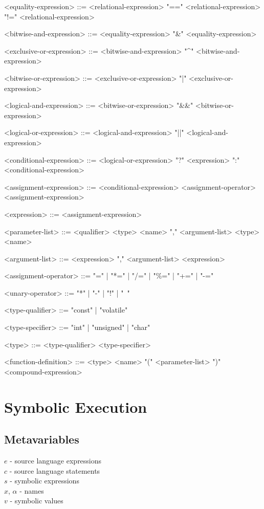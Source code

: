 \documentclass{article}
\begin{document}
\begin{grammar}
<equality-expression> ::= <relational-expression>
   "==" <relational-expression>
   "!=" <relational-expression>

<bitwise-and-expression> ::= <equality-expression>
   "&" <equality-expression>

<exclusive-or-expression> ::= <bitwise-and-expression>
   "^" <bitwise-and-expression>

<bitwise-or-expression> ::= <exclusive-or-expression>
   "|" <exclusive-or-expression>

<logical-and-expression> ::= <bitwise-or-expression>
   "&&" <bitwise-or-expression>

<logical-or-expression> ::= <logical-and-expression>
   "||" <logical-and-expression>

<conditional-expression> ::= <logical-or-expression>
   "?" <expression> ":" <conditional-expression>

<assignment-expression> ::= <conditional-expression>
   <assignment-operator> <assignment-expression>

<expression> ::= <assignment-expression>

<parameter-list> ::= <qualifier> <type> <name> "," <argument-list>
   <type> <name>

<argument-list> ::= <expression> "," <argument-list>
  \alt <expression>

<assignment-operator> ::= "=" | "*=" | "/=" | "\%=" | "+=" | "-="

<unary-operator> ::= "*" | "-" | "!" | "~"

<type-qualifier> ::= "const" | "volatile"

<type-specifier> ::= "int" | "unsigned" | "char" %

<type> ::= <type-qualifier> <type-specifier>

<function-definition> ::= <type> <name> "(" <parameter-list> ")" <compound-expression>

\end{grammar}

\section{Symbolic Execution}

\subsection{Metavariables}
$e$ - source language expressions\\
$c$ - source language statements\\
$s$ - symbolic expressions\\
$x$, $\alpha$ - names\\
$v$ - symbolic values\\
\end{document}
